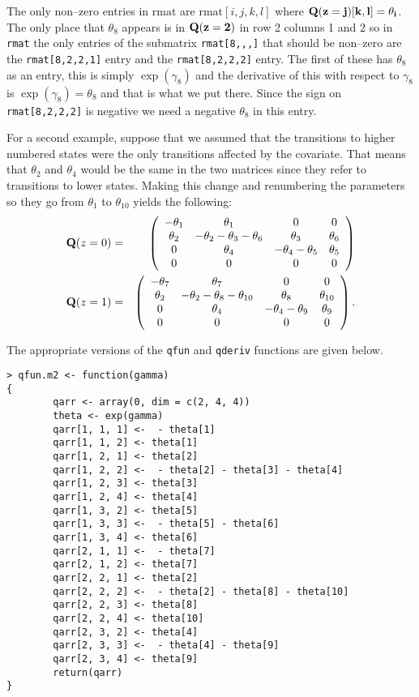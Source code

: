 \documentclass[12pt]{article}
\begin{document}
The only non--zero entries in $\mbox{rmat}$ are 
$\mbox{rmat}[i,j,k,l]$ where $\bf{Q}(z=j)[k,l]=\theta_i$. 
The only place that $\theta_8$ appears is in $\bf{Q}(z=2)$ in 
row 2 columns 1 and 2 so in \verb+rmat+ the only entries of
the submatrix \verb+rmat[8,,,]+ that should be non--zero
are the \verb+rmat[8,2,2,1]+ entry and the \verb+rmat[8,2,2,2]+
entry. The first of these has $\theta_8$ as an entry, this is
simply $\exp(\gamma_8)$ and the derivative of this with respect to
$\gamma_8$ is $\exp(\gamma_8)=\theta_8$ and that is what we put there.
Since the sign on \verb+rmat[8,2,2,2]+ is negative we need a negative
$\theta_8$ in this entry. 

For a second example, suppose that we assumed that the transitions to
higher numbered states were the only transitions affected by the covariate.
That means that $\theta_2$ and $\theta_4$ would be the same in the two
matrices since they refer to transitions to lower states.
Making this change and renumbering the parameters so they go from $\theta_1$
to $\theta_{10}$ yields the following:
\begin{eqnarray}
{\bf Q}(z=0) & = & 
\left( \begin{array}{cccc}
 - \theta_1 & \theta_1 & 0 & 0 \\
  \theta_2 & -\theta_2-\theta_3-\theta_6 & \theta_3 & \theta_6 \\
 0 & \theta_4 & -\theta_4-\theta_5 & \theta_5 \\
 0 & 0 & 0 & 0 \\
\end{array}
\right) \\
{\bf Q}(z=1) & = & 
\left( \begin{array}{cccc}
 - \theta_7 & \theta_7 & 0 & 0 \\
  \theta_2 & -\theta_2-\theta_8-\theta_{10} & \theta_8 & \theta_{10} \\
 0 & \theta_4 & -\theta_4-\theta_9 & \theta_9 \\
 0 & 0 & 0 & 0 \\
\end{array}
\right).
\end{eqnarray}

The appropriate versions of the \verb+qfun+ and \verb+qderiv+ functions
are given below.

\begin{verbatim}
> qfun.m2 <- function(gamma)
{
        qarr <- array(0, dim = c(2, 4, 4))
        theta <- exp(gamma)
        qarr[1, 1, 1] <-  - theta[1]
        qarr[1, 1, 2] <- theta[1]
        qarr[1, 2, 1] <- theta[2]
        qarr[1, 2, 2] <-  - theta[2] - theta[3] - theta[4]
        qarr[1, 2, 3] <- theta[3]
        qarr[1, 2, 4] <- theta[4]
        qarr[1, 3, 2] <- theta[5]
        qarr[1, 3, 3] <-  - theta[5] - theta[6]
        qarr[1, 3, 4] <- theta[6]
        qarr[2, 1, 1] <-  - theta[7]
        qarr[2, 1, 2] <- theta[7]
        qarr[2, 2, 1] <- theta[2]
        qarr[2, 2, 2] <-  - theta[2] - theta[8] - theta[10]
        qarr[2, 2, 3] <- theta[8]
        qarr[2, 2, 4] <- theta[10]
        qarr[2, 3, 2] <- theta[4]
        qarr[2, 3, 3] <-  - theta[4] - theta[9]
        qarr[2, 3, 4] <- theta[9]
        return(qarr)
}
\end{verbatim}
\end{document}
